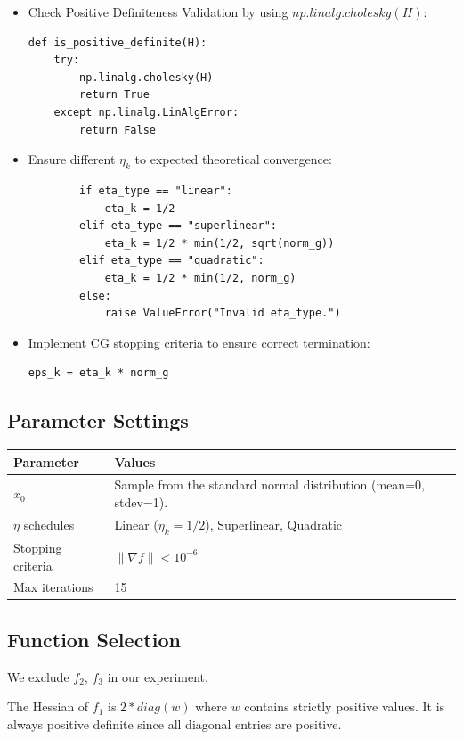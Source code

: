 \documentclass[12pt]{article}
\begin{document}
\begin{itemize}
    \item Check Positive Definiteness Validation by using $np.linalg.cholesky(H)$:
\begin{lstlisting}
def is_positive_definite(H):
    try:
        np.linalg.cholesky(H)
        return True
    except np.linalg.LinAlgError:
        return False
\end{lstlisting}
    \item Ensure different $\eta_k$ to expected theoretical convergence:
\begin{lstlisting}
        if eta_type == "linear":
            eta_k = 1/2 
        elif eta_type == "superlinear":
            eta_k = 1/2 * min(1/2, sqrt(norm_g))
        elif eta_type == "quadratic":
            eta_k = 1/2 * min(1/2, norm_g)
        else:
            raise ValueError("Invalid eta_type.")
\end{lstlisting}
    \item Implement CG stopping criteria to ensure correct termination:
\begin{lstlisting}
eps_k = eta_k * norm_g
\end{lstlisting}
\end{itemize}

\subsection{Parameter Settings}
\begin{tabular}{ll}
    \toprule
    Parameter & Values \\ 
    \midrule
    $x_0$ &  Sample from the standard normal distribution (mean=0, stdev=1).\\
    $\eta$ schedules & Linear ($\eta_k = 1/2$), Superlinear, Quadratic \\
    Stopping criteria & $\|\nabla f\| < 10^{-6}$ \\
    Max iterations & 15 \\
    \bottomrule
\end{tabular}

\subsection{Function Selection}
We exclude $f_2$, $f_3$ in our experiment. 

The Hessian of $f_1$ is $2*diag(w)$ where $w$ contains strictly positive values. It is always positive definite since all diagonal entries are positive.
\end{document}
